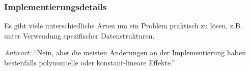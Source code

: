 \documentclass[aspectratio=1610,onlymath]{beamer}
\begin{document}
\begin{frame}\frametitle{Implementierungsdetails}

Es gibt viele unterschiedliche Arten um ein Problem praktisch zu lösen,
z.B. unter Verwendung spezifischer Datenstrukturen.\\\smallskip

\pause\bigskip

\emph{Antwort:} "`Nein, aber die meisten Änderungen an der Implementierung haben bestenfalls polynomielle oder konstant-lineare Effekte."'\bigskip



\end{frame}
\end{document}
